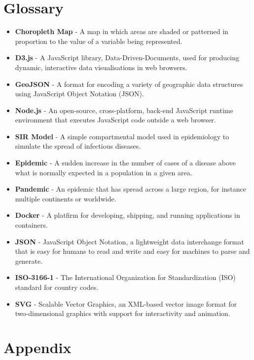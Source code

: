 \documentclass{report}
\begin{document}
\chapter{Glossary}
\begin{itemize}
    \item \textbf{Choropleth Map} - A map in which areas are shaded or patterned in proportion to the value of a variable being represented.
    \item \textbf{D3.js} - A JavaScript library, Data-Driven-Documents, used for producing dynamic, interactive data visualisations in web browsers.
    \item \textbf{GeoJSON} - A format for encoding a variety of geographic data structures using JavaScript Object Notation (JSON).
    \item \textbf{Node.js} - An open-source, cross-platform, back-end JavaScript runtime environment that executes JavaScript code outside a web browser.
    \item \textbf{SIR Model} - A simple compartmental model used in epidemiology to simulate the spread of infectious diseases.
    \item \textbf{Epidemic} - A sudden increase in the number of cases of a disease above what is normally expected in a population in a given area.
    \item \textbf{Pandemic} - An epidemic that has spread across a large region, for instance multiple continents or worldwide.
    \item \textbf{Docker} - A platfirm for developing, shipping, and running applications in containers.
    \item \textbf{JSON} - JavaScript Object Notation, a lightweight data interchange format that is easy for humans to read and write and easy for machines to parse and generate.
    \item \textbf{ISO-3166-1} - The International Organization for Standardization (ISO) standard for country codes.
    \item \textbf{SVG} - Scalable Vector Graphics, an XML-based vector image format for two-dimensional graphics with support for interactivity and animation.
\end{itemize}
\newpage

\newpage

\chapter{Appendix}
\end{document}
